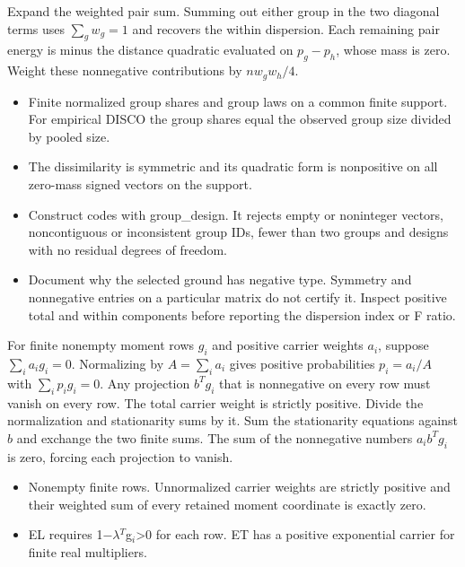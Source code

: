 \expandafter\def\csname statadic@proof@STATADIC-DISCO-001\endcsname{Expand the weighted pair sum. Summing out either group in the
  two diagonal terms uses $\sum_g w_g=1$ and recovers the within dispersion.
  Each remaining pair energy is minus the distance quadratic evaluated on
  $p_g-p_h$, whose mass is zero. Weight these nonnegative contributions by
  $n w_g w_h/4$.}
\expandafter\def\csname statadic@assumptions@STATADIC-DISCO-001\endcsname{\begin{itemize}
\item Finite normalized group shares and group laws on a common finite support. For empirical DISCO the group shares equal the observed group size divided by pooled size.
\item The dissimilarity is symmetric and its quadratic form is nonpositive on all zero-mass signed vectors on the support.
\end{itemize}}
\expandafter\def\csname statadic@diagnostics@STATADIC-DISCO-001\endcsname{\begin{itemize}
\item Construct codes with group\_design. It rejects empty or noninteger vectors, noncontiguous or inconsistent group IDs, fewer than two groups and designs with no residual degrees of freedom.
\item Document why the selected ground has negative type. Symmetry and nonnegative entries on a particular matrix do not certify it. Inspect positive total and within components before reporting the dispersion index or F ratio.
\end{itemize}}
\expandafter\def\csname statadic@statement@STATADIC-GEL-001\endcsname{For finite nonempty moment rows $g_i$ and positive
  carrier weights $a_i$, suppose $\sum_i a_i g_i=0$. Normalizing by
  $A=\sum_i a_i$ gives positive probabilities $p_i=a_i/A$ with
  $\sum_i p_i g_i=0$. Any projection $b^Tg_i$ that is nonnegative on
  every row must vanish on every row.}
\expandafter\def\csname statadic@proof@STATADIC-GEL-001\endcsname{The total carrier weight is strictly positive. Divide the
  normalization and stationarity sums by it. Sum the stationarity equations
  against $b$ and exchange the two finite sums. The sum of the nonnegative
  numbers $a_i b^Tg_i$ is zero, forcing each projection to vanish.}
\expandafter\def\csname statadic@assumptions@STATADIC-GEL-001\endcsname{\begin{itemize}
\item Nonempty finite rows. Unnormalized carrier weights are strictly positive and their weighted sum of every retained moment coordinate is exactly zero.
\item EL requires 1\ensuremath{-}\ensuremath{\lambda}\ensuremath{{}^T}g\ensuremath{{}_i}>0 for each row. ET has a positive exponential carrier for finite real multipliers.
\end{itemize}}
